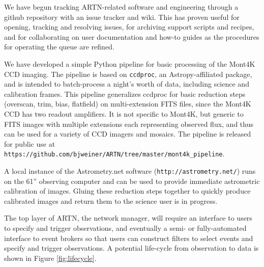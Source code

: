\documentclass[]{spie}  %
\begin{document}
We have begun tracking ARTN-related software and engineering through a github repository with an issue tracker and wiki. This has proven useful for opening, tracking and resolving issues, for archiving support scripts and recipes, and for collaborating on user documentation and how-to guides as the procedures for operating the queue are refined.

We have developed a simple Python pipeline for basic processing of the Mont4K CCD imaging.  The pipeline is based on {\tt ccdproc}, an Astropy-affiliated package\cite{astropy13,ccdproc15,astropy18}, and is intended to batch-process a night's worth of data, including science and calibration frames.
This pipeline generalizes ccdproc for basic reduction steps (overscan, trim, bias, flatfield) on multi-extension FITS files, since the Mont4K CCD has two readout amplifiers. It is not specific to Mont4K, but generic to FITS images with multiple extensions each representing observed flux, and thus can be used for a variety of CCD imagers and mosaics. The pipeline is released for public use at {\tt https://github.com/bjweiner/ARTN/tree/master/mont4k\_pipeline}. 

A local instance of the Astrometry.net software\cite{Lang10} ({\tt http://astrometry.net/}) runs on the 61'' observing computer and can be used to provide immediate astrometric calibration of images.  Gluing these reduction steps together to quickly produce calibrated images and return them to the science user is in progress.

The top layer of ARTN, the network manager, will require an interface to users to specify and trigger observations, and eventually a semi- or fully-automated interface to event brokers so that users can construct filters to select events and specify and trigger observations.  A potential life-cycle from observation to data is shown in Figure \ref{fig:lifecycle}.
\end{document}
